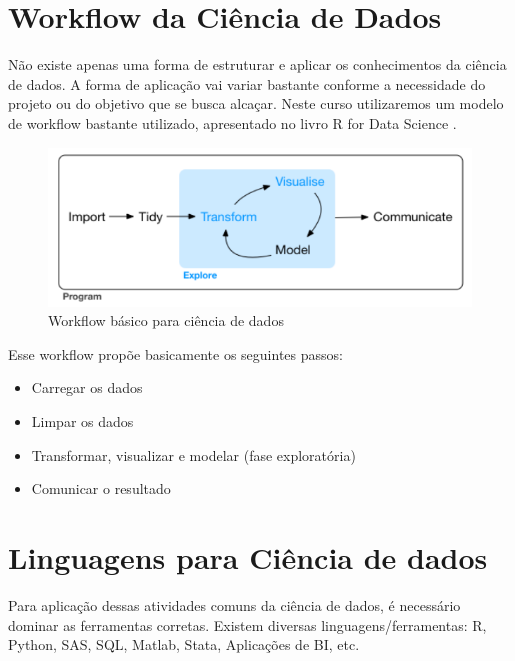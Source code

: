 \documentclass[]{book}
\providecommand{\tightlist}{%
  \setlength{\itemsep}{0pt}\setlength{\parskip}{0pt}}
\begin{document}
\section{Workflow da Ciência de
Dados}\label{workflow-da-ciencia-de-dados}

Não existe apenas uma forma de estruturar e aplicar os conhecimentos da
ciência de dados. A forma de aplicação vai variar bastante conforme a
necessidade do projeto ou do objetivo que se busca alcaçar. Neste curso
utilizaremos um modelo de workflow bastante utilizado, apresentado no
livro R for Data Science \citep{R-for-Data-Science}.

\begin{figure}

{\centering \includegraphics[width=1\linewidth]{imagens/workflow} 

}

\caption{Workflow básico para ciência de dados}\label{fig:unnamed-chunk-3}
\end{figure}

Esse workflow propõe basicamente os seguintes passos:

\begin{itemize}
\tightlist
\item
  Carregar os dados
\item
  Limpar os dados
\item
  Transformar, visualizar e modelar (fase exploratória)
\item
  Comunicar o resultado
\end{itemize}

\section{Linguagens para Ciência de
dados}\label{linguagens-para-ciencia-de-dados}

Para aplicação dessas atividades comuns da ciência de dados, é
necessário dominar as ferramentas corretas. Existem diversas
linguagens/ferramentas: R, Python, SAS, SQL, Matlab, Stata, Aplicações
de BI, etc.
\end{document}
